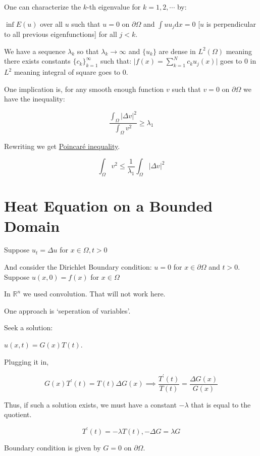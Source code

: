 \documentclass{article}
\theoremstyle{definition}
\begin{document}
One can characterize the \(k\)-th eigenvalue for \(k=1,2,\cdots\) by:

\(\inf E(u)\) over all \(u\)  such that \(u=0\) on \(\partial \Omega \) and \(\int u u_j \mathrm{d}x = 0\) [\(u\) is perpendicular to all previous eigenfunctions] for all \(j < k\).

We have a sequence \(\lambda_k\) so that \(\lambda_k\to \infty\) and \(\{ u_k \} \) are dense in \(L^2(\Omega)\) meaning there exists constants \(\{ c_k \}_{k=1}^\infty\) such that: \(\vert f(x) = \sum_{k=1}^N c_k u_j(x)  \vert \) goes to \(0\) in \(L^2\) meaning integral of square goes to \(0\).

One implication is, for any smooth enough function \(v\) such that \(v=0\) on \(\partial \Omega \) we have the inequality:

\[
    \frac{\int_\Omega \vert \Delta v \vert ^2}{\int_\Omega v^2}\geq \lambda_1
\]

Rewriting we get \underline{Poincar\'e inequality}.

\[
    \int_\Omega v^2 \leq \frac{1}{\lambda_1}\int_\Omega \vert \Delta v \vert ^2
\]

\section*{Heat Equation on a Bounded Domain}

Suppose \(u_t = \Delta u\) for \(x\in \Omega , t > 0\) 

And consider the Dirichlet Boundary condition: \(u = 0\) for \(x\in \partial \Omega \) and \(t > 0\). Suppose \(u(x,0)=f(x)\) for \(x\in \Omega\) 

In \(\mathbb{R}^n\) we used convolution. That will not work here.

One approach is `seperation of variables'.

Seek a solution:

\(\boxed{u(x,t)=G(x)T(t)}\).

Plugging it in,

\[
    G(x)T^{\prime} (t) = T(t)\Delta G(x) \implies \frac{T^{\prime} (t)}{T(t)} = \frac{\Delta G(x)}{G(x)}
\]

Thus, if such a solution exists, we must have a constant \(-\lambda\) that is equal to the quotient.

\[
    \boxed{T^{\prime} (t) = - \lambda T(t), -\Delta G = \lambda G}
\]

Boundary condition is given by \(G = 0\) on \(\partial \Omega \).
\end{document}
